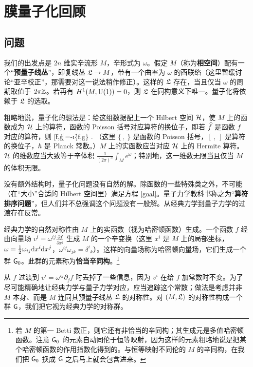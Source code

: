 \section{膜量子化回顾}\label{two}

\subsection{问题}\label{problem}

我们的出发点是 $2n$ 维实辛流形 $M$，辛形式为 $\omega$。假定 $M$（称为\textbf{相空间}）配有一个“\textbf{预量子线丛}”，即复线丛 ${\mathfrak L}\to M$，带有一个曲率为 $\omega$ 的酉联络（这里暂缓讨论“亚辛校正”，那需要对这一说法稍作修正）。这样的 ${\mathfrak L}$ 存在，当且仅当 $\omega$ 的周期取值于 $2\pi{\mathbb Z}$。若再有 $H^1(M,{\mathrm U}(1))=0$，则 ${\mathfrak L}$ 在同构意义下唯一。量子化将依赖于 ${\mathfrak L}$ 的选取。

粗略地说，量子化的想法是：给这组数据配上一个 Hilbert 空间 ${\mathcal H}$，使 $M$ 上的函数成为 ${\mathcal H}$ 上的算符，函数的 Poisson 括号对应算符的换位子，即若 $\widehat f$ 是函数 $f$ 对应的算符，则
\be\label{goal} [\h f,\h g]=-\i\hbar \h {\{f,g\} }. \ee
（这里 $\{~,~\}$ 是函数的 Poisson 括号，$[~,~]$ 是算符的换位子，$\hbar$ 是 Planck 常数。）$M$ 上的实函数应当对应 ${\mathcal H}$ 上的 Hermite 算符。${\mathcal H}$ 的维数应当大致等于辛体积 $\frac{1}{(2\pi)^n}\int_M e^\omega$；特别地，这一维数无限当且仅当 $M$ 的体积无限。

没有额外结构时，量子化问题没有自然的解。除函数的一些特殊类之外，不可能（在“大小”合适的 Hilbert 空间里）满足方程 \eqref{goal}。量子力学教科书称之为“\textbf{算符排序问题}”，但人们并不总强调这个问题没有一般解。从经典力学到量子力学的过渡存在反常。

经典力学的自然对称性由 $M$ 上的实函数（视为哈密顿函数）生成。一个函数 $f$ 经由向量场 $v^i=\omega^{ij}\frac{\partial f}{\partial x^j}$ 生成 $M$ 的一个辛变换（这里 $x^i$ 是 $M$ 上的局部坐标，$\omega=\frac{1}{2}\omega_{ij}{\mathrm d} x^i {\mathrm d} x^j$，$\omega^{ij}\omega_{jk}=\delta^i{}_k$）。这样的向量场称为哈密顿向量场，它们生成一个群 ${\text{\sf G}}_0$。此群的元素称为\textbf{恰当辛同构}。\footnote{若 $M$ 的第一 Betti 数正，则它还有非恰当的辛同构；其生成元是多值哈密顿函数。注意 ${\text{\sf G}}_0$ 的元素自动同伦于恒等映射，因为这样的元素粗略地说是把某个哈密顿函数的作用指数化得到的。与恒等映射不同伦的 $M$ 的辛同构，在我们把 ${\text{\sf G}}_0$ 换成 ${\text{\sf G}}$ 之后马上就会包含进来。}

从 $f$ 过渡到 $v^i=\omega^{ij}\partial_j f$ 时丢掉了一些信息，因为 $v^i$ 在给 $f$ 加常数时不变。为了尽可能精确地让经典力学与量子力学对应，应当追踪这个常数；做法是考虑并非 $M$ 本身、而是 $M$ 连同其预量子线丛 ${\mathfrak L}$ 的对称性。对 $(M,{\mathfrak L})$ 的对称性构成一个群 ${\text{\sf G}}$，我们把它视为经典力学的对称群。

